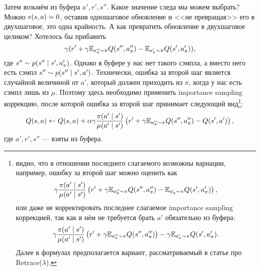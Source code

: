 Затем возьмём из буфера $a', r', s''$. Какое значение следа мы можем выбрать? Можно $e(s, a) \HM= 0$, оставив одношаговое обновление и <<не превращая>> его в двухшаговое, это одна крайность. А как превратить обновление в двухшаговое целиком? Хотелось бы прибавить
$$\gamma (r' + \gamma \mathbb{E}_{a''_\pi \sim \pi} Q(s'', a''_\pi) - \mathbb{E}_{a'_\pi \sim \pi} Q(s', a'_\pi)),$$
где $s'' \HM\sim p(s'' \mid s', a'_\pi)$. Однако в буфере у нас нет такого сэмпла, а вместо него есть сэмпл $s'' \HM\sim p(s'' \mid s', a')$. Технически, ошибка за второй шаг является случайной величиной от $a'$, который должен приходить из $\pi$, когда у нас есть сэмпл лишь из $\mu$. Поэтому здесь необходимо применить importance sampling коррекцию, после которой ошибка за второй шаг принимает следующий вид\footnote{видно, что в отношении последнего слагаемого возможны вариации, например, ошибку за второй шаг можно оценить как
$$\gamma \frac{\pi(a' \mid s')}{\mu(a' \mid s')} \left( r' + \gamma \mathbb{E}_{a''_\pi \sim \pi} Q(s'', a''_\pi) - \mathbb{E}_{a'_\pi \sim \pi} Q(s', a'_\pi) \right),$$
или даже не корректировать последнее слагаемое importance sampling коррекцией, так как в нём не требуется брать $a'$ обязательно из буфера:
$$\gamma \frac{\pi(a' \mid s')}{\mu(a' \mid s')} \left( r' + \gamma \mathbb{E}_{a''_\pi \sim \pi} Q(s'', a''_\pi)\right) - \gamma \mathbb{E}_{a'_\pi \sim \pi} Q(s', a'_\pi).$$
Далее в формулах предполагается вариант, рассматриваемый в статье про Retrace($\lambda$). 
}:
\begin{equation}\label{offpolicytwostepupdatesecondpart}
Q(s, a) \leftarrow Q(s, a) + \alpha \gamma \frac{\pi(a' \mid s')}{\mu(a' \mid s')} \left( r' + \gamma \mathbb{E}_{a''_\pi \sim \pi} Q(s'', a''_\pi) - Q(s', a') \right),
\end{equation}
где $a', r', s''$ --- взяты из буфера. 


